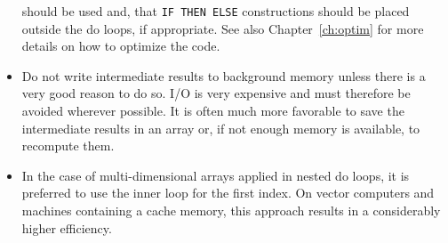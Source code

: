 \documentclass[12pt]{book}
\begin{document}
\begin{itemize}
        should be used and, that {\tt IF THEN ELSE} constructions should be placed outside the do loops,
        if appropriate. See also Chapter~\ref{ch:optim} for more details on how to optimize the code.
  \item Do not write intermediate results to background memory unless there is a very good reason to
        do so. I/O is very expensive and must therefore be avoided wherever possible. It is often much
        more favorable to save the intermediate results in an array or, if not enough memory is available,
        to recompute them.
  \item In the case of multi-dimensional arrays applied in nested do loops, it is preferred to use the
        inner loop for the first index. On vector computers and machines containing a cache memory, this
        approach results in a considerably higher efficiency.
\end{itemize}

 \label{ch:contr}
\end{document}
